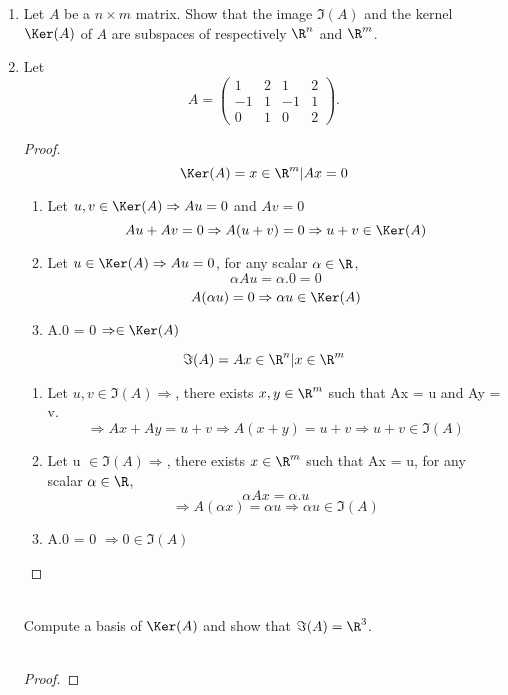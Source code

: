 \documentclass[11pt,nocut]{article}
\begin{document}
\begin{problem}[3 points]\leavevmode
	\begin{enumerate}[label=\normalfont(\textbf{\alph*})]
		\item Let $A$ be a $n \times m$ matrix. Show that the image $\Im(A)$ and the kernel $\Ker(A)$ of $A$ are subspaces of respectively $\R^n$ and $\R^m$.
		\item Let
			$$
			A = 
			\begin{pmatrix}
				1 & 2 & 1 & 2 \\
				-1 & 1 & -1 & 1 \\
				0 & 1 & 0 & 2 
			\end{pmatrix}.
			$$
		\begin{proof}
		$$\Ker(A) = {x \in \R^m | Ax = 0}$$
		\begin{enumerate}
			\item Let $u, v \in \Ker(A) \Rightarrow Au = 0$ and $Av = 0$\\
			$$ Au + Av = 0 \Rightarrow A(u+v) = 0 \Rightarrow u + v \in \Ker(A)$$
			\item Let $u \in \Ker(A) \Rightarrow Au = 0$, for any scalar $\alpha \in \R$,\\
			$$ \alpha A u = \alpha . 0 = 0 $$
			$$ A(\alpha u) = 0 \Rightarrow \alpha u \in \Ker(A)$$
			\item A.0 = 0 $\Rightarrow \in \Ker(A)$
		\end{enumerate}
		$$\Im(A) = {Ax \in \R^n | x \in \R^m}$$
		\begin{enumerate}
			\item Let $u, v \in \Im(A) \Rightarrow$, there exists $x, y \in \R^m$ such that Ax = u and Ay = v.
			$$ \Rightarrow Ax + Ay = u + v \Rightarrow A(x+y) = u + v \Rightarrow u + v \in \Im(A)$$
			\item Let u $\in \Im(A) \Rightarrow$, there exists $x \in \R^m$ such that Ax = u, for any scalar $\alpha \in \R$,
			$$ \alpha A x = \alpha . u$$
			$$ \Rightarrow A(\alpha x) = \alpha u \Rightarrow \alpha u \in \Im(A)$$
			\item A.0 = 0 $\Rightarrow 0 \in \Im(A)$
		\end{enumerate}
		\end{proof}
		\vspace{5mm}\\
		Compute a basis of $\Ker(A)$ and show that $\Im(A) = \R^3$.\\
		\vspace{2mm}\\
		\begin{proof}

\end{proof}
\end{enumerate}
\end{problem}
\end{document}
